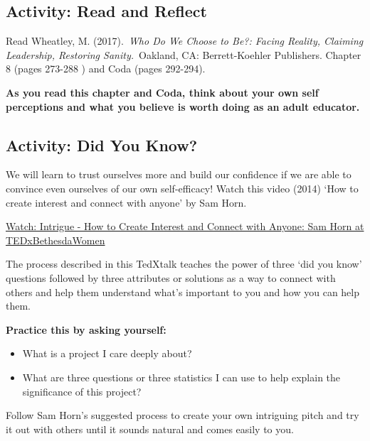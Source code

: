 \documentclass[
]{book}
\providecommand{\tightlist}{%
  \setlength{\itemsep}{0pt}\setlength{\parskip}{0pt}}
\begin{document}
\hypertarget{activity-read-and-reflect-1}{%
\subsection*{Activity: Read and Reflect}\label{activity-read-and-reflect-1}}

\begin{reflect}
Read Wheatley, M. (2017).~\emph{Who Do We Choose to Be?: Facing Reality,
Claiming Leadership, Restoring Sanity.}~Oakland, CA: Berrett-Koehler
Publishers. Chapter 8 (pages 273-288 ) and Coda (pages 292-294).

\textbf{As you read this chapter and Coda, think about your own self
perceptions and what you believe is worth doing as an adult educator.}
\end{reflect}

\hypertarget{activity-did-you-know}{%
\subsection*{Activity: Did You Know?}\label{activity-did-you-know}}

\begin{reflect}
We will learn to trust ourselves more and build our confidence if we are
able to convince even ourselves of our own self-efficacy! Watch this
video (2014) `How to create interest and connect with anyone' by Sam
Horn.

\href{https://www.youtube.com/watch?v=Xlg8zdSVjgg}{Watch: Intrigue - How
to Create Interest and Connect with Anyone: Sam Horn at
TEDxBethesdaWomen}

The process described in this TedXtalk teaches the power of three `did
you know' questions followed by three attributes or solutions as a way
to connect with others and help them understand what's important to you
and how you can help them.

\textbf{Practice this by asking yourself:}

\begin{itemize}
\tightlist
\item
  What is a project I care deeply about?\\
\item
  What are three questions or three statistics I can use to help explain
  the significance of this project?
\end{itemize}

Follow Sam Horn's suggested process to create your own intriguing pitch
and try it out with others until it sounds natural and comes easily to
you.
\end{reflect}
\end{document}
